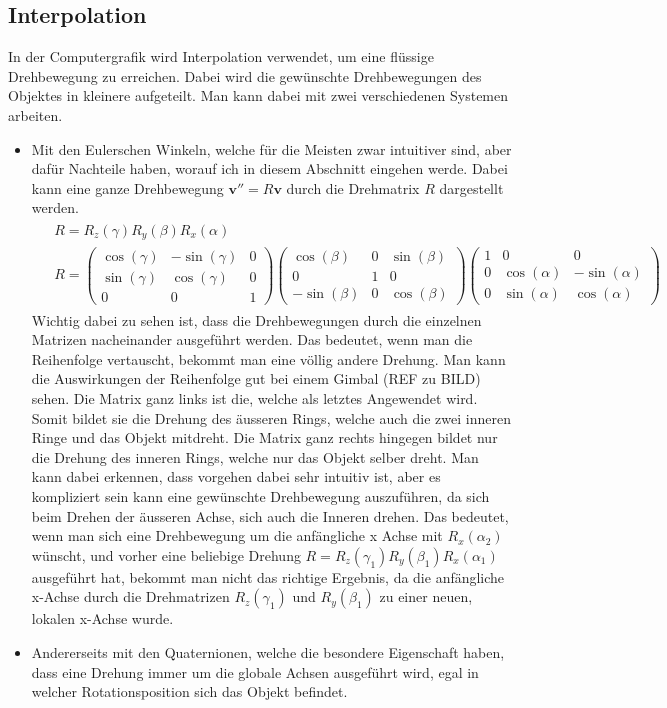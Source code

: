 \subsection{Interpolation}
In der Computergrafik wird Interpolation verwendet, um eine flüssige Drehbewegung zu erreichen. Dabei wird die gewünschte Drehbewegungen des Objektes in kleinere aufgeteilt. Man kann dabei mit zwei verschiedenen Systemen arbeiten. 
\begin{itemize}
	\item Mit den Eulerschen Winkeln, welche für die Meisten zwar intuitiver sind, aber dafür Nachteile haben, worauf ich in diesem Abschnitt eingehen werde. Dabei kann eine ganze Drehbewegung $\mathbf{v}'' = R\mathbf{v}$ durch die Drehmatrix $R$ dargestellt werden. 
	\begin{align}
		\begin{split}
			&R = R_z(\gamma) R_y(\beta) R_x(\alpha)\\
			&R = 
			\begin{pmatrix} 
				\cos(\gamma) & -\sin(\gamma) & 0\\ \sin(\gamma) & \cos(\gamma) & 0 \\ 0 & 0 & 1 
			\end{pmatrix}
			\begin{pmatrix}
				\cos(\beta) &  0 & \sin(\beta)\\ 0 & 1 & 0 \\ -\sin(\beta) & 0 & \cos(\beta)
			\end{pmatrix}
			\begin{pmatrix} 
				1 & 0 & 0 \\ 0 & \cos(\alpha) & -\sin(\alpha)\\ 0 & \sin(\alpha) & \cos(\alpha)
			\end{pmatrix}
		\end{split}
	\end{align}
	Wichtig dabei zu sehen ist, dass die Drehbewegungen durch die einzelnen Matrizen nacheinander ausgeführt werden. Das bedeutet, wenn man die Reihenfolge vertauscht, bekommt man eine völlig andere Drehung. Man kann die Auswirkungen der Reihenfolge gut bei einem Gimbal (REF zu BILD) sehen. Die Matrix ganz links ist die, welche als letztes Angewendet wird. Somit bildet sie die Drehung des äusseren Rings, welche auch die zwei inneren Ringe und das Objekt mitdreht. Die Matrix ganz rechts hingegen bildet nur die Drehung des inneren Rings, welche nur das Objekt selber dreht. Man kann dabei erkennen, dass vorgehen dabei sehr intuitiv ist, aber es kompliziert sein kann eine gewünschte Drehbewegung auszuführen, da sich beim Drehen der äusseren Achse, sich auch die Inneren drehen. Das bedeutet, wenn man sich eine Drehbewegung um die anfängliche x Achse mit $R_x(\alpha_2)$ wünscht, und vorher eine beliebige Drehung $R = R_z(\gamma_1) R_y(\beta_1) R_x(\alpha_1)$ ausgeführt hat, bekommt man nicht das richtige Ergebnis, da die anfängliche x-Achse durch die Drehmatrizen $R_z(\gamma_1)$ und $R_y(\beta_1)$ zu einer neuen, lokalen x-Achse wurde. 
	\item Andererseits mit den Quaternionen, welche die besondere Eigenschaft haben, dass eine Drehung immer um die globale Achsen ausgeführt wird, egal in welcher Rotationsposition sich das Objekt befindet.
\end{itemize}
